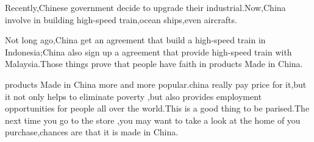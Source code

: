\documentclass{ctexart}
\begin{document}
Recently,Chinese government decide to upgrade their industrial.Now,China involve in building high-speed train,ocean ships,even aircrafts.    
\par Not long ago,China get an agreement that build a high-speed train in Indonesia;China also sign up a agreement that provide high-speed train with Malaysia.Those things prove that people have faith in products Made in China.    
\par products Made in China more and more popular.china really pay price for it,but it not only helps to eliminate poverty ,but also provides employment opportunities for people all over the world.This is a good thing to be parised.The next time you go to the store ,you may want to take a look at the home of you purchase,chances are that it is made in China.
\end{document}
